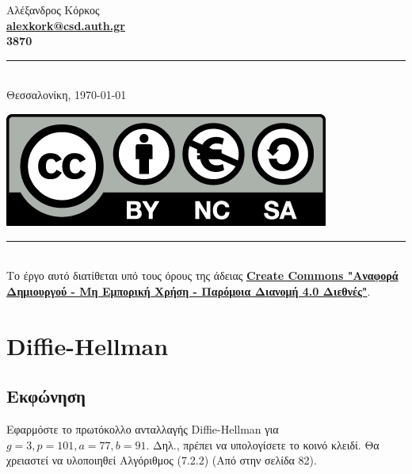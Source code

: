 \documentclass[oneside]{article}
\newcommand{\Rule}{\rule{\linewidth}{0.5mm}}
\begin{document}
\begin{titlepage}
    \vspace*{\fill}
    
    \begin{center}
        Αλέξανδρος Κόρκος \\
        \textbf{\href{mailto:alexkork@csd.auth.gr}{alexkork@csd.auth.gr}}\\
        \textbf{3870}
        \Rule \\[0.4cm]
        Θεσσαλονίκη, \today
    \end{center}
    
\end{titlepage}

\vspace*{\fill}

\begin{center}
    \href{https://creativecommons.org/licenses/by-nc-sa/4.0/deed.el}{\includegraphics[scale=0.2]{Images/cc.png}} \\
    \Rule \\[0.4cm]
    Το έργο αυτό διατίθεται υπό τους όρους της άδειας \textbf{\href{https://creativecommons.org/licenses/by-nc-sa/4.0/deed.el}{Create Commons "Αναφορά Δημιουργού - Μη Εμπορική Χρήση - Παρόμοια Διανομή 4.0 Διεθνές"}}. \\ 
\end{center}

\newpage

\tableofcontents

\newpage

\section{Diffie-Hellman}

\subsection{Εκφώνηση} 

Εφαρμόστε το πρωτόκολλο ανταλλαγής Diffie-Hellman για $g = 3, p = 101, a = 77, b = 91$. Δηλ., πρέπει να υπολογίσετε το κοινό κλειδί. Θα χρειαστεί να υλοποιηθεί Αλγόριθμος (7.2.2) (Από \cite{draz} στην σελίδα 82).
\end{document}
